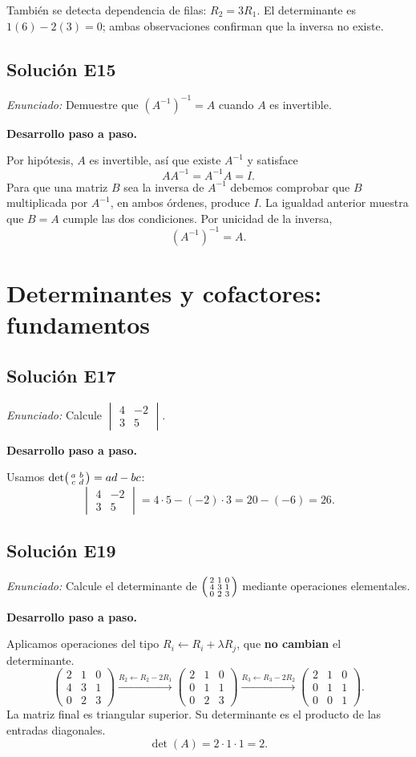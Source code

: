 \documentclass[12pt]{article}
\theoremstyle{remark}
\newcommand{\solucion}[2]{\Needspace{11\baselineskip}\subsection*{Solución E#1}\noindent\textit{Enunciado:} #2\par\medskip\noindent\textbf{Desarrollo paso a paso.}\par\medskip}
\begin{document}
También se detecta dependencia de filas: $R_2=3R_1$. El determinante es $1(6)-2(3)=0$; ambas observaciones confirman que la inversa no existe.


\medskip

\solucion{15}{Demuestre que $(A^{-1})^{-1}=A$ cuando $A$ es invertible.}
Por hipótesis, $A$ es invertible, así que existe $A^{-1}$ y satisface
\[
AA^{-1}=A^{-1}A=I.
\]
Para que una matriz $B$ sea la inversa de $A^{-1}$ debemos comprobar que $B$ multiplicada por $A^{-1}$, en ambos órdenes, produce $I$. La igualdad anterior muestra que $B=A$ cumple las dos condiciones. Por unicidad de la inversa,
\[
\boxed{(A^{-1})^{-1}=A}.
\]

\medskip

\section{Determinantes y cofactores: fundamentos}

\solucion{17}{Calcule $\begin{vmatrix}4&-2\\3&5\end{vmatrix}$.}
Usamos $\det\begin{psmallmatrix}a&b\\c&d\end{psmallmatrix}=ad-bc$:
\[
\begin{vmatrix}4&-2\\3&5\end{vmatrix}=4\cdot 5-(-2)\cdot 3=20-(-6)=26.
\]

\medskip

\solucion{19}{Calcule el determinante de $\begin{psmallmatrix}2&1&0\\4&3&1\\0&2&3\end{psmallmatrix}$ mediante operaciones elementales.}
Aplicamos operaciones del tipo $R_i\leftarrow R_i+\lambda R_j$, que \textbf{no cambian} el determinante.
\[
\begin{pmatrix}2&1&0\\4&3&1\\0&2&3\end{pmatrix}\xrightarrow{R_2\leftarrow R_2-2R_1}\begin{pmatrix}2&1&0\\0&1&1\\0&2&3\end{pmatrix}\xrightarrow{R_3\leftarrow R_3-2R_2}\begin{pmatrix}2&1&0\\0&1&1\\0&0&1\end{pmatrix}.
\]
La matriz final es triangular superior. Su determinante es el producto de las entradas diagonales. \[
\boxed{\det(A)=2\cdot1\cdot1=2}.
\]
\end{document}
